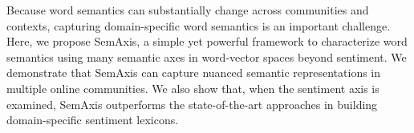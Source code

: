 Because word semantics can substantially change across communities and contexts, capturing domain-specific word semantics is an important challenge. Here, we propose SemAxis, a simple yet powerful framework to characterize word semantics using many semantic axes in word-vector spaces beyond sentiment. We demonstrate that SemAxis can capture nuanced semantic representations in multiple online communities. We also show that, when the sentiment axis is examined, SemAxis outperforms the state-of-the-art approaches in building domain-specific sentiment lexicons.
